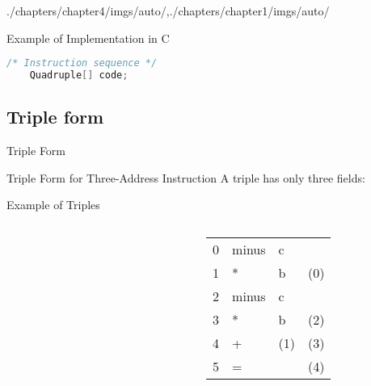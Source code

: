 \begin{graphicspathcontext}{{./chapters/chapter4/imgs/auto/},{./chapters/chapter1/imgs/auto/}}
\begin{bibunit}[apalike]
\begin{frame}[background=6,fragile]{Example of Implementation in C}
\begin{lstlisting}[language=C,basicstyle=\scriptsize]
	/* Instruction sequence */
	Quadruple[] code;
	\end{lstlisting}
\end{frame}

\subsection{Triple form}
\subsectiontableofcontentslide

\begin{frame}{Triple Form}
	\vspace{.25cm}
	\begin{definitionblock}{Triple Form for Three-Address Instruction}
		A triple has only three fields:
		\begin{center}
		\end{center}
	\end{definitionblock}
	\vspace{.25cm}
\end{frame}

\begin{frame}[background=8]{Example of Triples}
	\begin{columns}
		\begin{column}{.45\linewidth}
			\begin{tac}[\linewidth]
			\end{tac}
		\end{column}
		\begin{column}{.1\linewidth}
		\end{column}
		\begin{column}{.45\linewidth}
			\begin{tabularx}{\linewidth}{|c|X|X|X|}
			\hline
			\tabularheading&\chead{op}&\chead{arg$_1$}&\chead{arg$_2$}\\
			\hline
			0 & minus & c & \\
			\hline
			1 & * & b & (0) \\
			\hline
			2 & minus & c & \\
			\hline
			3 & * & b & (2) \\
			\hline
			4 & + & (1) & (3) \\
			\hline
			5 & = & \tactext{a} & (4) \\
			\hline
			\end{tabularx}
		\end{column}
	\end{columns}
\end{frame}


\end{bibunit}
\end{graphicspathcontext}
